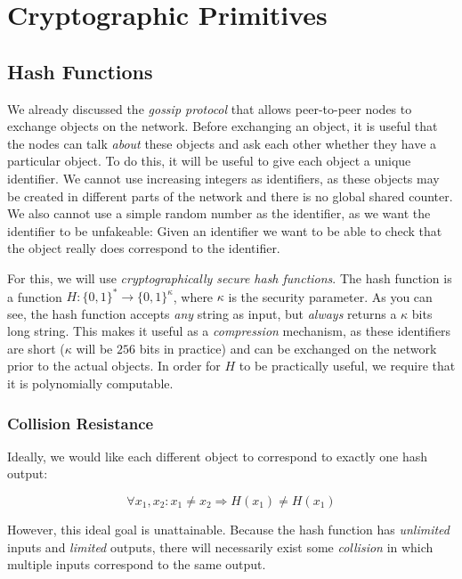 \chapter{Cryptographic Primitives}\label{chapter.primitives}

\section{Hash Functions}

We already discussed the \emph{gossip protocol} that allows peer-to-peer nodes to exchange
objects on the network. Before exchanging an object, it is useful that the nodes can talk
\emph{about} these objects and ask each other whether they have a particular object. To
do this, it will be useful to give each object a unique identifier. We cannot use
increasing integers as identifiers, as these objects may be created in different parts of
the network and there is no global shared counter. We also cannot use a simple random
number as the identifier, as we want the identifier to be unfakeable: Given an identifier
we want to be able to check that the object really does correspond to the identifier.

For this, we will use \emph{cryptographically secure hash functions}. The hash function
is a function
$H: \{0, 1\}^* \longrightarrow \{0, 1\}^\kappa$,
where $\kappa$ is the
security parameter. As you can see, the hash function accepts \emph{any} string as input,
but \emph{always} returns a $\kappa$ bits long string. This makes it useful as a
\emph{compression} mechanism, as these identifiers are short ($\kappa$ will be $256$
bits in practice) and can be exchanged on the network prior to the actual objects. In order for $H$ to be practically useful, we require that it is polynomially computable.

\subsection*{Collision Resistance}

Ideally, we would like each different object to correspond to exactly one hash
output:

\[
  \forall x_1, x_2: x_1 \neq x_2 \Rightarrow H(x_1) \neq H(x_1)
\]

However, this ideal goal is unattainable.
Because the hash function has \emph{unlimited} inputs and \emph{limited} outputs,
there will necessarily exist some \emph{collision} in which multiple inputs correspond
to the same output.

